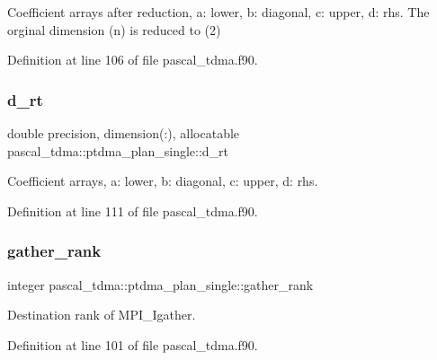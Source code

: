 Coefficient arrays after reduction, a\+: lower, b\+: diagonal, c\+: upper, d\+: rhs. The orginal dimension (n) is reduced to (2) 



Definition at line 106 of file pascal\+\_\+tdma.\+f90.

\mbox{\label{structpascal__tdma_1_1ptdma__plan__single_a627be8624cd48aa5b3aad7f6cf8d0b08}} 
\subsubsection{\texorpdfstring{d\_rt}{d\_rt}}
{\footnotesize\ttfamily double precision, dimension(\+:), allocatable pascal\+\_\+tdma\+::ptdma\+\_\+plan\+\_\+single\+::d\+\_\+rt}



Coefficient arrays, a\+: lower, b\+: diagonal, c\+: upper, d\+: rhs. 



Definition at line 111 of file pascal\+\_\+tdma.\+f90.

\mbox{\label{structpascal__tdma_1_1ptdma__plan__single_af0d3b3bce8b9956aa9e80ba0712a9a9d}} 
\subsubsection{\texorpdfstring{gather\_rank}{gather\_rank}}
{\footnotesize\ttfamily integer pascal\+\_\+tdma\+::ptdma\+\_\+plan\+\_\+single\+::gather\+\_\+rank}



Destination rank of M\+P\+I\+\_\+\+Igather. 



Definition at line 101 of file pascal\+\_\+tdma.\+f90.

\mbox{\label{structpascal__tdma_1_1ptdma__plan__single_af473533b36508af4e0752cee8d182334}} 

